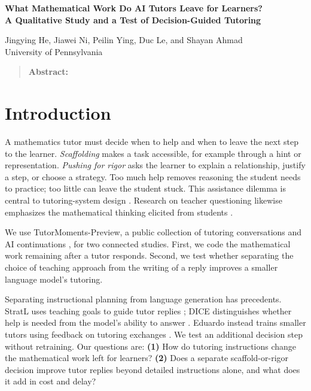 \documentclass[10pt,a4paper]{article}
\begin{document}
\begin{center}
{\sffamily\bfseries\fontsize{14}{16}\selectfont What Mathematical Work Do AI Tutors Leave for Learners?\\A Qualitative Study and a Test of Decision-Guided Tutoring\par}
\vspace{8pt}
Jingying He, Jiawei Ni, Peilin Ying, Duc Le, and Shayan Ahmad\\
University of Pennsylvania
\end{center}
\vspace{2pt}
\begin{quotation}\noindent
\textbf{Abstract:} 
\end{quotation}



\section{Introduction}
A mathematics tutor must decide when to help and when to leave the next step to the learner. \emph{Scaffolding} makes a task accessible, for example through a hint or representation. \emph{Pushing for rigor} asks the learner to explain a relationship, justify a step, or choose a strategy. Too much help removes reasoning the student needs to practice; too little can leave the student stuck. This assistance dilemma is central to tutoring-system design \citep{koedinger2007assistance}. Research on teacher questioning likewise emphasizes the mathematical thinking elicited from students \citep{franke2009questioning}.

We use TutorMoments-Preview, a public collection of tutoring conversations and AI continuations \citep{zhang2026tutormoments}, for two connected studies. First, we code the mathematical work remaining after a tutor responds. Second, we test whether separating the choice of teaching approach from the writing of a reply improves a smaller language model's tutoring.

Separating instructional planning from language generation has precedents. StratL uses teaching goals to guide tutor replies \citep{puech2025stratl}; DICE distinguishes whether help is needed from the model's ability to answer \citep{pal2026dice}. Eduardo instead trains smaller tutors using feedback on tutoring exchanges \citep{macina2026eduardo}. We test an additional decision step without retraining. Our questions are: \textbf{(1)} How do tutoring instructions change the mathematical work left for learners? \textbf{(2)} Does a separate scaffold-or-rigor decision improve tutor replies beyond detailed instructions alone, and what does it add in cost and delay?
\end{document}
